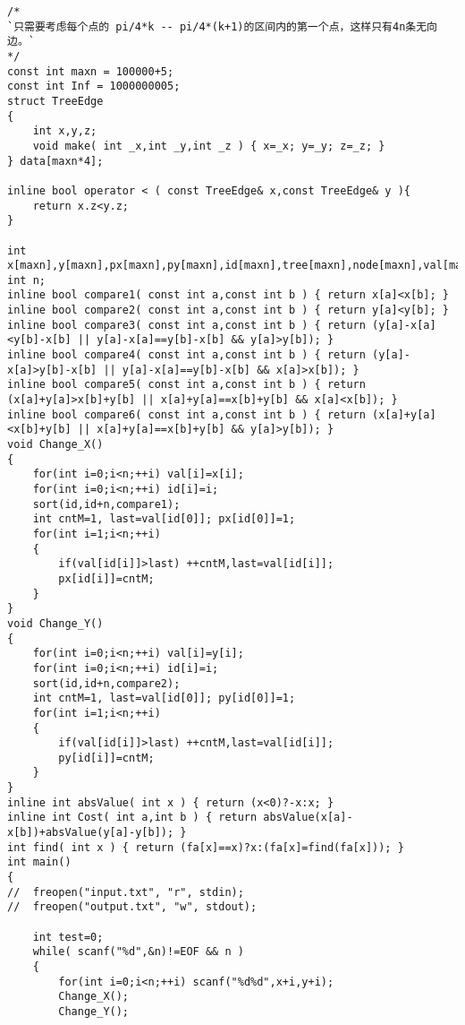 \begin{lstlisting}
/*
`只需要考虑每个点的 pi/4*k -- pi/4*(k+1)的区间内的第一个点，这样只有4n条无向边。`
*/
const int maxn = 100000+5;
const int Inf = 1000000005;
struct TreeEdge
{
	int x,y,z;
	void make( int _x,int _y,int _z ) { x=_x; y=_y; z=_z; }
} data[maxn*4];

inline bool operator < ( const TreeEdge& x,const TreeEdge& y ){
	return x.z<y.z;
}

int x[maxn],y[maxn],px[maxn],py[maxn],id[maxn],tree[maxn],node[maxn],val[maxn],fa[maxn];
int n;
inline bool compare1( const int a,const int b ) { return x[a]<x[b]; }
inline bool compare2( const int a,const int b ) { return y[a]<y[b]; }
inline bool compare3( const int a,const int b ) { return (y[a]-x[a]<y[b]-x[b] || y[a]-x[a]==y[b]-x[b] && y[a]>y[b]); }
inline bool compare4( const int a,const int b ) { return (y[a]-x[a]>y[b]-x[b] || y[a]-x[a]==y[b]-x[b] && x[a]>x[b]); }
inline bool compare5( const int a,const int b ) { return (x[a]+y[a]>x[b]+y[b] || x[a]+y[a]==x[b]+y[b] && x[a]<x[b]); }
inline bool compare6( const int a,const int b ) { return (x[a]+y[a]<x[b]+y[b] || x[a]+y[a]==x[b]+y[b] && y[a]>y[b]); }
void Change_X()
{
	for(int i=0;i<n;++i) val[i]=x[i];
	for(int i=0;i<n;++i) id[i]=i;
	sort(id,id+n,compare1);
	int cntM=1, last=val[id[0]]; px[id[0]]=1;
	for(int i=1;i<n;++i)
	{
		if(val[id[i]]>last) ++cntM,last=val[id[i]];
		px[id[i]]=cntM;
	}
}
void Change_Y()
{
	for(int i=0;i<n;++i) val[i]=y[i];
	for(int i=0;i<n;++i) id[i]=i;
	sort(id,id+n,compare2);
	int cntM=1, last=val[id[0]]; py[id[0]]=1;
	for(int i=1;i<n;++i)
	{
		if(val[id[i]]>last) ++cntM,last=val[id[i]];
		py[id[i]]=cntM;
	}
}
inline int absValue( int x ) { return (x<0)?-x:x; }
inline int Cost( int a,int b ) { return absValue(x[a]-x[b])+absValue(y[a]-y[b]); }
int find( int x ) { return (fa[x]==x)?x:(fa[x]=find(fa[x])); }
int main()
{
//	freopen("input.txt", "r", stdin);
//	freopen("output.txt", "w", stdout);
	
	int test=0;
	while( scanf("%d",&n)!=EOF && n )
	{
		for(int i=0;i<n;++i) scanf("%d%d",x+i,y+i);
		Change_X();
		Change_Y();
		

\end{lstlisting}
